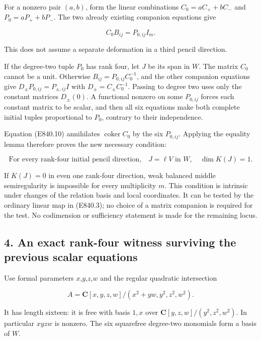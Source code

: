 For a nonzero pair \((a,b)\), form the linear combinations
\(C_0=aC_++bC_-\) and \(P_0=aP_++bP_-\). The two already existing
companion equations give

\[
                         C_0B_{ij}=P_{0,ij}I_m.
 \tag{E840.10}
\]

This does not assume a separate deformation in a third pencil direction.

If the degree-two tuple \(P_0\) has rank four, let \(J\) be its span in
\(W\). The matrix \(C_0\) cannot be a unit. Otherwise
\(B_{ij}=P_{0,ij}C_0^{-1}\), and the other companion equations give
\(D_\pm P_{0,ij}=P_{\pm,ij}I\) with \(D_\pm=C_\pm C_0^{-1}\). Passing to
degree two uses only the constant matrices \(D_\pm(0)\). A functional
nonzero on some \(P_{0,ij}\) forces each constant matrix to be scalar,
and then all six equations make both complete initial tuples
proportional to \(P_0\), contrary to their independence.

Equation (E840.10) annihilates \(\operatorname{coker}C_0\) by the six
\(P_{0,ij}\). Applying the equality lemma therefore proves the new
necessary condition:

\[
 \boxed{\text{For every rank-four initial pencil direction,}
        \quad J=\ell V\text{ in }W,
        \quad\dim K(J)=1.}
 \tag{E840.11}
\]

If \(K(J)=0\) in even one rank-four direction, weak balanced middle
semiregularity is impossible for every multiplicity \(m\). This
condition is intrinsic under changes of the relation basis and local
coordinates. It can be tested by the ordinary linear map in (E840.3); no
choice of a matrix companion is required for the test. No codimension or
sufficiency statement is made for the remaining locus.

\subsection{4. An exact rank-four witness surviving the previous scalar
equations}\label{an-exact-rank-four-witness-surviving-the-previous-scalar-equations}

Use formal parameters \(x\),\(y\),\(z\),\(w\) and the regular quadratic
intersection

\[
 A=\mathbf C[x,y,z,w]/(x^2+yw,y^2,z^2,w^2).
 \tag{E840.12}
\]

It has length sixteen: it is free with basis \(1,x\) over
\(\mathbf C[y,z,w]/(y^2,z^2,w^2)\). In particular \(xyzw\) is nonzero.
The six squarefree degree-two monomials form a basis of \(W\).


